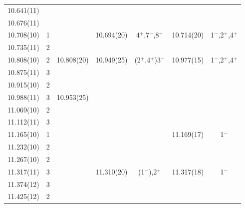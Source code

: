 \begin{center}
\begin{longtable}{cc c cc cc}
 10.641(11)     &       &                   &                   &                   &                   &                   \\
 10.676(11)     &       &                   &                   &                   &                   &                   \\
 10.708(10)     &   1   &                   &     10.694(20)    &4$^+$,7$^-$,8$^+$  &    10.714(20)     & 1$^-$,2$^+$,4$^+$ \\
 10.735(11)     &   2   &                   &                   &                   &                   &                   \\
 10.808(10)     &   2   &     10.808(20)    &     10.949(25)    &(2$^+$,4$^+$)3$^-$ &   10.977(15)      &1$^-$,2$^+$,4$^+$  \\
 10.875(11)     &   3   &                   &                   &                   &                   &                   \\
 10.915(10)     &   2   &                   &                   &                   &                   &                   \\
10.988(11)      &   3   &     10.953(25)    &                   &                   &                   &                   \\
 11.069(10)     &   2   &                   &                   &                   &                   &                   \\
  11.112(11)    &   3   &                   &                   &                   &                   &                   \\
 11.165(10)     &   1   &                   &                   &                   &   11.169(17)      &       1$^-$       \\
 11.232(10)     &   2   &                   &                   &                   &                   &                   \\
 11.267(10)     &   2   &                   &                   &                   &                   &                   \\
 11.317(11)     &   3   &                   &     11.310(20)    &  (1$^-$),2$^+$    &   11.317(18)      &       1$^-$       \\
 11.374(12)     &   3   &                   &                   &                   &                   &                   \\
 11.425(12)     &   2   &                   &                   &                   &                   &                   \\

\end{longtable}
\end{center}
